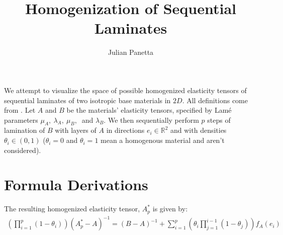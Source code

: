 \documentclass[10pt]{article}
\title{Homogenization of Sequential Laminates}
\author{Julian Panetta}
\begin{document}
\maketitle

We attempt to visualize the space of possible homogenized elasticity tensors of
sequential laminates of two isotropic base materials in $2D$. All definitions
come from \cite{allaire2002shape}. Let $A$ and $B$ be the materials' elasticity
tensors, specified by Lam\'e parameters $\mu_A,\ \lambda_A,\ \mu_B,\ $ and
$\lambda_B$. We then sequentially perform $p$ steps of lamination of $B$ with
layers of $A$ in directions $e_i \in \mathbb{R}^2$ and with densities $\theta_i \in
(0, 1)$ ($\theta_i = 0$ and $\theta_i = 1$ mean a homogenous material and aren't
considered).

\section{Formula Derivations}
The resulting homogenized elasticity tensor, $A^*_p$ is given by:
\begin{align}
\label{eqn:Astar}
\left(\prod_{i=1}^p (1 - \theta_i) \right)\left(A^*_p - A\right)^{-1} =
\left(B - A\right)^{-1} + \sum_{i = 1}^p
\left( \theta_i \prod_{j = 1}^{i - 1} (1 - \theta_j)\right) f_A(e_i)
\end{align}
\end{document}
